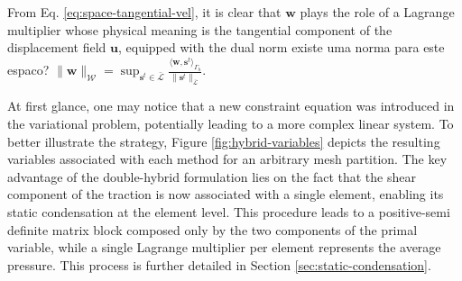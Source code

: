 \documentclass[english,11pt,3p,number,sort&compress]{elsarticle}
\newcommand{\giovane}{\color{red}{\bf\Large GA} \color{cyan} }
\begin{document}
\noindent From Eq. \eqref{eq:space-tangential-vel}, it is clear that $\bm{w}$ plays the role of a Lagrange multiplier whose physical meaning is the tangential component of the displacement field $\bm{u}$, equipped with the dual norm {\giovane existe uma norma para este espaco? $\lVert\bm{w}\rVert_{\mathcal{W}}=\sup_{\bm{s}^t \in \bar{\mathcal{L}}} \frac{\langle\bm{w},\bm{s}^t \rangle_{\Gamma_h}}{\lVert\bm{s}^t\rVert_{\bar{\mathcal{L}}}}$.}

At first glance, one may notice that a new constraint equation was introduced in the variational problem, potentially leading to a more complex linear system. To better illustrate the strategy, Figure \ref{fig:hybrid-variables} depicts the resulting variables associated with each method for an arbitrary mesh partition. The key advantage of the double-hybrid formulation lies on the fact that the shear component of the traction is now associated with a single element, enabling its static condensation at the element level. This procedure leads to a positive-semi definite matrix block composed only by the two components of the primal variable, while a single Lagrange multiplier per element represents the average pressure. This process is further detailed in Section \ref{sec:static-condensation}.
\end{document}
